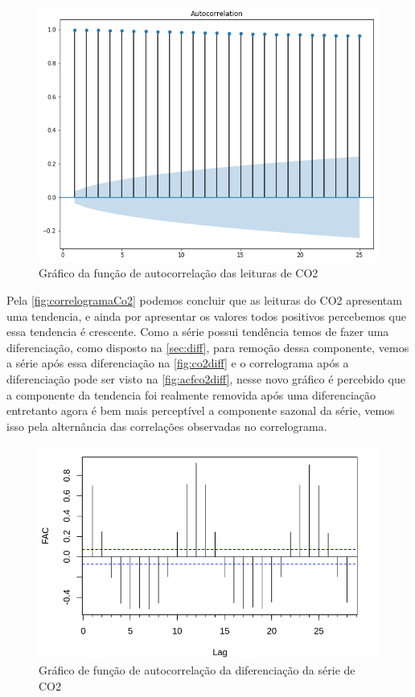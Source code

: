 \documentclass[
	12pt,
	oneside,
	a4paper,
	english,
	brazil
]{abntex2}
\begin{document}
\begin{figure}
    \centering
    \caption{Gráfico da função de autocorrelação das leituras de 
    CO2}\label{fig:correlogramaCo2}
    \includegraphics[width=.6\linewidth]{images/acf_co2.png}
\end{figure}

Pela \autoref{fig:correlogramaCo2} podemos concluir que as leituras do CO2 
apresentam uma tendencia, e ainda por apresentar os valores todos positivos 
percebemos que essa tendencia é crescente. Como a série possui tendência temos 
de fazer uma diferenciação, como disposto na \autoref{sec:diff}, para remoção 
dessa componente, vemos a série após essa diferenciação na \autoref{fig:co2diff} 
e o correlograma após a diferenciação pode ser visto na 
\autoref{fig:acfco2diff}, nesse novo gráfico é percebido que a componente da 
tendencia foi realmente removida após uma diferenciação entretanto agora é bem 
mais perceptível a componente sazonal da série, vemos isso pela alternância das 
correlações observadas no correlograma.

\begin{figure}
    \centering
    \caption{Gráfico de função de autocorrelação da diferenciação da série de 
    CO2}\label{fig:acfco2diff}
    \includegraphics[width=.6\linewidth]{images/acf_co2_diff.png}
\end{figure}
\end{document}
